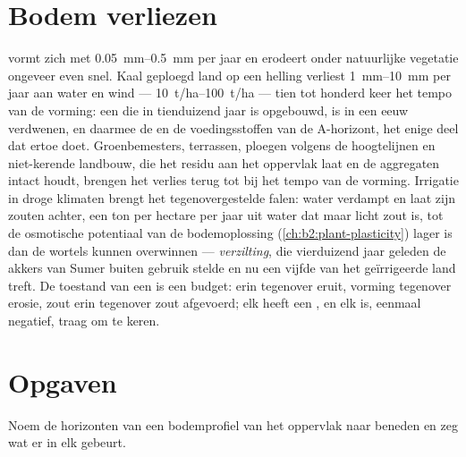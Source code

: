 \section{Bodem verliezen}

\begin{proposition}\label{prop:b2:living-soil:erosion}
 vormt zich met \qtyrange{0.05}{0.5}{mm} per jaar en erodeert onder
natuurlijke vegetatie ongeveer even snel. Kaal geploegd land op een
helling verliest \qtyrange{1}{10}{mm} per jaar aan water en wind ---
\qtyrange{10}{100}{t/ha} --- tien tot honderd keer het tempo van de
vorming: een  die in tienduizend jaar is opgebouwd, is in een eeuw
verdwenen, en daarmee de  en de voedingsstoffen van de A-horizont,
het enige deel dat ertoe doet. Groenbemesters, terrassen, ploegen volgens de
hoogtelijnen en niet-kerende landbouw, die het residu aan het oppervlak laat en
de aggregaten intact houdt, brengen het verlies terug tot bij het tempo van de
vorming. Irrigatie in droge klimaten brengt het tegenovergestelde falen:
water verdampt en laat zijn zouten achter, een ton per hectare per jaar uit
water dat maar licht zout is, tot de osmotische potentiaal van de
bodemoplossing (\cref{ch:b2:plant-plasticity}) lager is dan de wortels kunnen
overwinnen --- \emph{verzilting}, die vierduizend jaar geleden de akkers van
Sumer buiten gebruik stelde en nu een vijfde van het geïrrigeerde land treft.
De toestand van een  is een budget:  erin tegenover  eruit,
vorming tegenover erosie, zout erin tegenover zout afgevoerd; elk heeft een
, en elk is, eenmaal negatief, traag om te keren.
\end{proposition}

\section{Opgaven}

\begin{exercise}[$\star$]\label{exo:b2:living-soil:1}
Noem de horizonten van een bodemprofiel van het oppervlak naar beneden en zeg
wat er in elk gebeurt.
\end{exercise}

